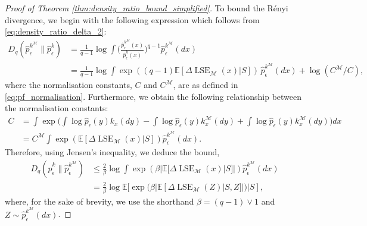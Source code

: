 \documentclass[10pt]{article}
\theoremstyle{plain}
\theoremstyle{definition}
\theoremstyle{remark}
\newcommand{\M}{{\mathcal{M}}}
\newcommand{\lse}{\operatorname{LSE}}
\newcommand{\E}{\mathbb{E}}
\begin{document}
\begin{proof}[Proof of Theorem \ref{thm:density_ratio_bound_simplified}]
To bound the R\'enyi divergence, we begin with the following expression which follows from \eqref{eq:density_ratio_delta_2}:
\begin{align*}
    D_q(\hat{p}_\epsilon^{k^\M} \| \hat{p}_\epsilon^k) &= \frac{1}{q - 1} \log \int \bigg ( \frac{\hat{p}_\epsilon^{k^\M}(x)}{\hat{p}_\epsilon^k(x)} \bigg )^{q - 1} \hat{p}_\epsilon^{k^\M}(dx)\\
    &= \frac{1}{q - 1} \log \int \exp((q-1) \E[\Delta \lse_\M(x)|S]) \, \hat{p}_\epsilon^{k^\M}(dx) + \log (C^\M/C),
\end{align*}
where the normalisation constants, \(C\) and \(C^\M\), are as defined in \eqref{eq:pf_normalisation}. Furthermore, we obtain the following relationship between the normalisation constants:
\begin{align*}
    C &= \int \exp \bigg ( \int \log \hat{p}_\epsilon(y) k_x(dy) - \int \log \hat{p}_\epsilon(y) k^\M_x(dy) + \int \log \hat{p}_\epsilon(y) k^\M_x(dy) \bigg ) dx\\
    &= C^\M \int \exp (\E[\Delta \lse_\M(x)|S]) \hat{p}_\epsilon^{k^\M}(dx).
\end{align*}
Therefore, using Jensen's inequality, we deduce the bound,
\begin{align}
    D_q(\hat{p}_\epsilon^k \| \hat{p}_\epsilon^{k^\M}) &\leq \frac{2}{\beta} \log \int \exp (\beta |\E[\Delta \lse_\M(x)|S]|) \hat{p}_\epsilon^{k^\M}(dx) \nonumber\\
    &= \frac{2}{\beta} \log \E[\exp (\beta | \E[\Delta \lse_\M(Z)|S, Z] |) | S],\label{eq:thm_11}
\end{align}
where, for the sake of brevity, we use the shorthand \(\beta = (q - 1) \vee 1\) and \(Z \sim \hat{p}_\epsilon^{k^\M}(dx)\).


\end{proof}
\end{document}
